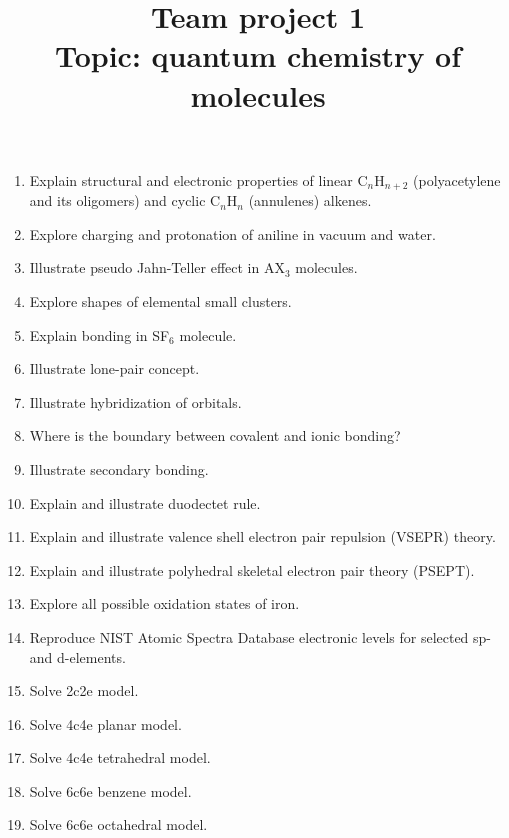\documentclass{Project}
\begin{document}
\title{Team project 1 \\ Topic: quantum chemistry of molecules}
\maketitle

\preface{}

\begin{enumerate}
\item Explain structural and electronic properties of linear C$_n$H$_{n+2}$ (polyacetylene and its oligomers) and cyclic C$_n$H$_n$ (annulenes) alkenes.
\item Explore charging and protonation of aniline in vacuum and water.
\item Illustrate pseudo Jahn-Teller effect in AX$_3$ molecules.
\item Explore shapes of elemental small clusters.
\item Explain bonding in SF$_6$ molecule.
\item Illustrate lone-pair concept.
\item Illustrate hybridization of orbitals.
\item Where is the boundary between covalent and ionic bonding?
\item Illustrate secondary bonding.
\item Explain and illustrate duodectet rule.
\item Explain and illustrate valence shell electron pair repulsion (VSEPR) theory.
\item Explain and illustrate polyhedral skeletal electron pair theory (PSEPT).
\item Explore all possible oxidation states of iron.
\item Reproduce NIST Atomic Spectra Database electronic levels for selected sp- and d-elements.
\item Solve 2c2e model.
\item Solve 4c4e planar model.
\item Solve 4c4e tetrahedral model.
\item Solve 6c6e benzene model.
\item Solve 6c6e octahedral model.
\end{enumerate}

\reminder{}
\end{document}
